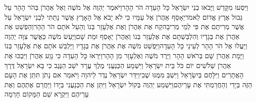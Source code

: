 \documentclass[../main/main.tex]{subfiles}
\begin{document}
\begin{multicols*}{\ncols}
וַיִּסְעוּ מִקָּדֵשׁ וַיָּבֹאוּ בְנֵי יִשְׂרָאֵל כָּל הָעֵדָה הֹר הָהָר\PreVerseSpace{}וַיֹּאמֶר יַהְוֶה אֶל מֹשֶׁה וְאֶל אַהֲרֹן בְּהֹר הָהָר עַל גְּבוּל אֶרֶץ אֱדוֹם לֵאמֹר\PreVerseSpace{}יֵאָסֵף אַהֲרֹן אֶל עַמָּיו כִּי לֹא יָבֹא אֶל הָאָרֶץ אֲשֶׁר נָתַתִּי לִבְנֵי יִשְׂרָאֵל עַל אֲשֶׁר מְרִיתֶם אֶת פִּי לְמֵי מְרִיבָה\PreVerseSpace{}קַח אֶת אַהֲרֹן וְאֶת אֶלְעָזָר בְּנוֹ וְהַעַל אֹתָם הֹר הָהָר\PreVerseSpace{}וְהַפְשֵׁט אֶת אַהֲרֹן אֶת בְּגָדָיו וְהִלְבַּשְׁתָּם אֶת אֶלְעָזָר בְּנוֹ וְאַהֲרֹן יֵאָסֵף וּמֵת שָׁם\PreVerseSpace{}וַיַּעַשׂ מֹשֶׁה כַּאֲשֶׁר צִוָּה יַהְוֶה וַיַּעֲלוּ אֶל הֹר הָהָר לְעֵינֵי כָּל הָעֵדָה\PreVerseSpace{}וַיַּפְשֵׁט מֹשֶׁה אֶת אַהֲרֹן אֶת בְּגָדָיו וַיַּלְבֵּשׁ אֹתָם אֶת אֶלְעָזָר בְּנוֹ וַיָּמָת אַהֲרֹן שָׁם בְּרֹאשׁ הָהָר וַיֵּרֶד מֹשֶׁה וְאֶלְעָזָר מִן הָהָר\PreVerseSpace{}וַיִּרְאוּ כָּל הָעֵדָה כִּי גָוַע אַהֲרֹן וַיִּבְכּוּ אֶת אַהֲרֹן שְׁלֹשִׁים יוֹם כֹּל בֵּית יִשְׂרָאֵל \ClosedSection{}וַיִּשְׁמַע הַכְּנַעֲנִי מֶלֶךְ עֲרָד יֹשֵׁב הַנֶּגֶב כִּי בָּא יִשְׂרָאֵל דֶּרֶךְ הָאֲתָרִים וַיִּלָּחֶם בְּיִשְׂרָאֵל וַיִּשְׁבְּ מִמֶּנּוּ שֶׁבִי\PreVerseSpace{}וַיִּדַּר יִשְׂרָאֵל נֶדֶר לַיהוָה וַיֹּאמַר אִם נָתֹן תִּתֵּן אֶת הָעָם הַזֶּה בְּיָדִי וְהַחֲרַמְתִּי אֶת עָרֵיהֶם\PreVerseSpace{}וַיִּשְׁמַע יַהְוֶה בְּקוֹל יִשְׂרָאֵל וַיִּתֵּן אֶת הַכְּנַעֲנִי בְּיָדוֹ\OmitEnd{} וַיַּחֲרֵם אֶתְהֶם וְאֶת עָרֵיהֶם וַיִּקְרָא שֵׁם הַמָּקוֹם חָרְמָה\OpenSection{}\par

\end{multicols*}
\end{document}
